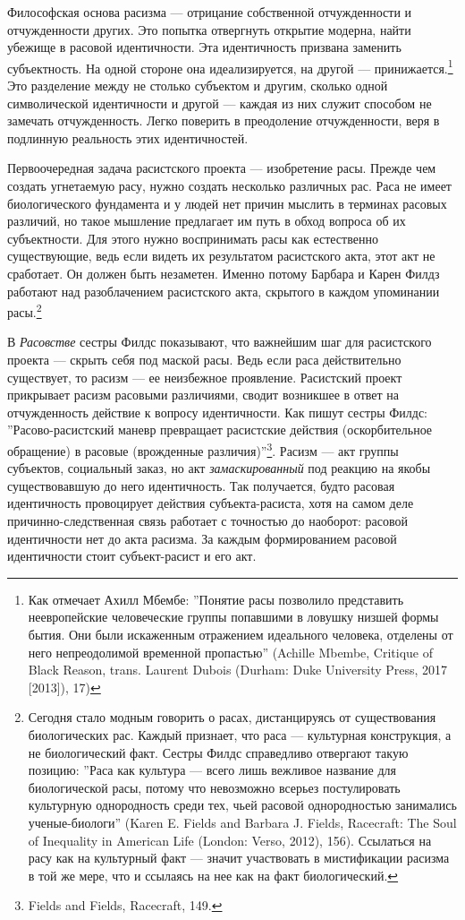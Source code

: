 \documentclass[12pt]{book}
\begin{document}
Философская основа расизма --- отрицание собственной отчужденности и отчужденности других. Это попытка отвергнуть открытие модерна, найти убежище в расовой идентичности. Эта идентичность призвана заменить субъектность. На одной стороне она идеализируется, на другой --- принижается.\footnote{Как отмечает Ахилл Мбембе: ''Понятие расы позволило представить неевропейские человеческие группы попавшими в ловушку низшей формы бытия. Они были искаженным отражением идеального человека, отделены от него непреодолимой временной пропастью'' (Achille Mbembe, Critique of Black Reason, trans. Laurent Dubois (Durham: Duke University Press, 2017 [2013]), 17)} Это разделение между не столько субъектом и другим, сколько одной символической идентичности и другой --- каждая из них служит способом не замечать отчужденность. Легко поверить в преодоление отчужденности, веря в подлинную реальность этих идентичностей.

Первоочередная задача расистского проекта --- изобретение расы. Прежде чем создать угнетаемую расу, нужно создать несколько различных рас. Раса не имеет биологического фундамента и у людей нет причин мыслить в терминах расовых различий, но такое мышление предлагает им путь в обход вопроса об их субъектности. Для этого нужно воспринимать расы как естественно существующие, ведь если видеть их результатом расистского акта, этот акт не сработает. Он должен быть незаметен. Именно потому Барбара и Карен Филдз работают над разоблачением расистского акта, скрытого в каждом упоминании расы.\footnote{Сегодня стало модным говорить о расах, дистанцируясь от существования биологических рас. Каждый признает, что раса --- культурная конструкция, а не биологический факт. Сестры Филдс справедливо отвергают такую позицию: ''Раса как культура --- всего лишь вежливое название для биологической расы, потому что невозможно всерьез постулировать культурную однородность среди тех, чьей расовой однородностью занимались ученые-биологи'' (Karen E. Fields and Barbara J. Fields, Racecraft: The Soul of Inequality in American Life (London: Verso, 2012), 156). Ссылаться на расу как на культурный факт --- значит участвовать в мистификации расизма в той же мере, что и ссылаясь на нее как на факт биологический.}

В \textit{Расовстве} сестры Филдс показывают, что важнейшим шаг для расистского проекта --- скрыть себя под маской расы. Ведь если раса действительно существует, то расизм --- ее неизбежное проявление. Расистский проект прикрывает расизм расовыми различиями, сводит возникшее в ответ на отчужденность действие к вопросу идентичности. Как пишут сестры Филдс: ''Расово-расистский маневр превращает расистские действия (оскорбительное обращение) в расовые (врожденные различия)''\footnote{Fields and Fields, Racecraft, 149.}. Расизм --- акт группы субъектов, социальный заказ, но акт \textit{замаскированный} под реакцию на якобы существовавшую до него идентичность. Так получается, будто расовая идентичность провоцирует действия субъекта-расиста, хотя на самом деле причинно-следственная связь работает с точностью до наоборот: расовой идентичности нет до акта расизма. За каждым формированием расовой идентичности стоит субъект-расист и его акт.
\end{document}
